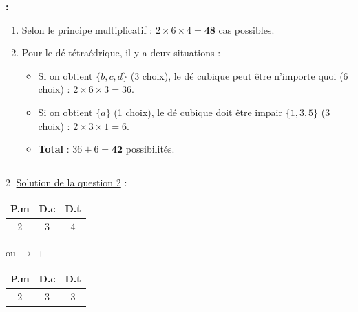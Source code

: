 \documentclass[12pt,a4paper]{article}
\begin{document}
\noindent \textbf{\color{red}{Solution} :}
\begin{enumerate}
    \item Selon le principe multiplicatif : $2 \times 6 \times 4 = \mathbf{48}$ cas possibles.
    \item Pour le dé tétraédrique, il y a deux situations :
    \begin{itemize}
        \item Si on obtient $\{b, c, d\}$ (3 choix), le dé cubique peut être n'importe quoi (6 choix) : $2 \times 6 \times 3 = 36$.
        \item Si on obtient $\{a\}$ (1 choix), le dé cubique doit être impair $\{1, 3, 5\}$ (3 choix) : $2 \times 3 \times 1 = 6$.
        \item \textbf{Total} : $36 + 6 = \mathbf{42}$ possibilités.
    \end{itemize}
\end{enumerate}

\vspace{2em}
\hrule
\vspace{1em}
\noindent \textcircled{2} \underline{Solution de la question 2} :

\vspace{1.5em}

\begin{center}
\renewcommand{\arraystretch}{1.5}
\begin{tabular}{|c|c|c|}
    \hline
    P.m & D.c & D.t \\
    \hline
    {\color{green!60!black}\Large 2} & {\color{green!60!black}\Large 3} & {\color{green!60!black}\Large 4} \\
    \hline
\end{tabular}

\vspace{1em}
{\Large ou $\longrightarrow$ \color{red}\textcircled{+}}
\vspace{1em}

\begin{tabular}{|c|c|c|}
    \hline
    P.m & D.c & D.t \\
    \hline
    {\color{green!60!black}\Large 2} & {\color{green!60!black}\Large 3} & {\color{green!60!black}\Large 3} \\
    \hline
\end{tabular}
\end{center}
\end{document}
